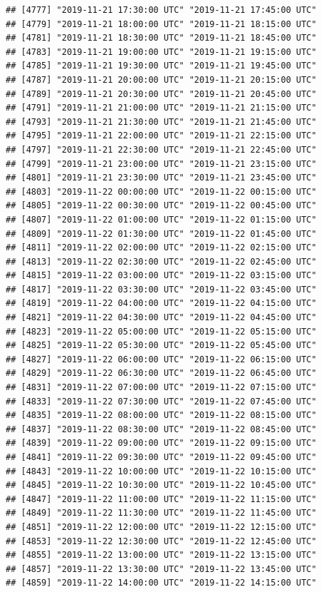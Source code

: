 \documentclass{article}\usepackage[]{graphicx}\usepackage[]{color}
\makeatletter
\newenvironment{kframe}{%
 \def\at@end@of@kframe{}%
 \ifinner\ifhmode%
  \def\at@end@of@kframe{\end{minipage}}%
  \begin{minipage}{\columnwidth}%
 \fi\fi%
 \def\FrameCommand##1{\hskip\@totalleftmargin \hskip-\fboxsep
 \colorbox{shadecolor}{##1}\hskip-\fboxsep
     \hskip-\linewidth \hskip-\@totalleftmargin \hskip\columnwidth}%
 \MakeFramed {\advance\hsize-\width
   \@totalleftmargin\z@ \linewidth\hsize
   \@setminipage}}%
 {\par\unskip\endMakeFramed%
 \at@end@of@kframe}
\newenvironment{knitrout}{}{} %
\makeatother
\begin{document}
\begin{knitrout}
\begin{kframe}
\begin{verbatim}
## [4777] "2019-11-21 17:30:00 UTC" "2019-11-21 17:45:00 UTC"
## [4779] "2019-11-21 18:00:00 UTC" "2019-11-21 18:15:00 UTC"
## [4781] "2019-11-21 18:30:00 UTC" "2019-11-21 18:45:00 UTC"
## [4783] "2019-11-21 19:00:00 UTC" "2019-11-21 19:15:00 UTC"
## [4785] "2019-11-21 19:30:00 UTC" "2019-11-21 19:45:00 UTC"
## [4787] "2019-11-21 20:00:00 UTC" "2019-11-21 20:15:00 UTC"
## [4789] "2019-11-21 20:30:00 UTC" "2019-11-21 20:45:00 UTC"
## [4791] "2019-11-21 21:00:00 UTC" "2019-11-21 21:15:00 UTC"
## [4793] "2019-11-21 21:30:00 UTC" "2019-11-21 21:45:00 UTC"
## [4795] "2019-11-21 22:00:00 UTC" "2019-11-21 22:15:00 UTC"
## [4797] "2019-11-21 22:30:00 UTC" "2019-11-21 22:45:00 UTC"
## [4799] "2019-11-21 23:00:00 UTC" "2019-11-21 23:15:00 UTC"
## [4801] "2019-11-21 23:30:00 UTC" "2019-11-21 23:45:00 UTC"
## [4803] "2019-11-22 00:00:00 UTC" "2019-11-22 00:15:00 UTC"
## [4805] "2019-11-22 00:30:00 UTC" "2019-11-22 00:45:00 UTC"
## [4807] "2019-11-22 01:00:00 UTC" "2019-11-22 01:15:00 UTC"
## [4809] "2019-11-22 01:30:00 UTC" "2019-11-22 01:45:00 UTC"
## [4811] "2019-11-22 02:00:00 UTC" "2019-11-22 02:15:00 UTC"
## [4813] "2019-11-22 02:30:00 UTC" "2019-11-22 02:45:00 UTC"
## [4815] "2019-11-22 03:00:00 UTC" "2019-11-22 03:15:00 UTC"
## [4817] "2019-11-22 03:30:00 UTC" "2019-11-22 03:45:00 UTC"
## [4819] "2019-11-22 04:00:00 UTC" "2019-11-22 04:15:00 UTC"
## [4821] "2019-11-22 04:30:00 UTC" "2019-11-22 04:45:00 UTC"
## [4823] "2019-11-22 05:00:00 UTC" "2019-11-22 05:15:00 UTC"
## [4825] "2019-11-22 05:30:00 UTC" "2019-11-22 05:45:00 UTC"
## [4827] "2019-11-22 06:00:00 UTC" "2019-11-22 06:15:00 UTC"
## [4829] "2019-11-22 06:30:00 UTC" "2019-11-22 06:45:00 UTC"
## [4831] "2019-11-22 07:00:00 UTC" "2019-11-22 07:15:00 UTC"
## [4833] "2019-11-22 07:30:00 UTC" "2019-11-22 07:45:00 UTC"
## [4835] "2019-11-22 08:00:00 UTC" "2019-11-22 08:15:00 UTC"
## [4837] "2019-11-22 08:30:00 UTC" "2019-11-22 08:45:00 UTC"
## [4839] "2019-11-22 09:00:00 UTC" "2019-11-22 09:15:00 UTC"
## [4841] "2019-11-22 09:30:00 UTC" "2019-11-22 09:45:00 UTC"
## [4843] "2019-11-22 10:00:00 UTC" "2019-11-22 10:15:00 UTC"
## [4845] "2019-11-22 10:30:00 UTC" "2019-11-22 10:45:00 UTC"
## [4847] "2019-11-22 11:00:00 UTC" "2019-11-22 11:15:00 UTC"
## [4849] "2019-11-22 11:30:00 UTC" "2019-11-22 11:45:00 UTC"
## [4851] "2019-11-22 12:00:00 UTC" "2019-11-22 12:15:00 UTC"
## [4853] "2019-11-22 12:30:00 UTC" "2019-11-22 12:45:00 UTC"
## [4855] "2019-11-22 13:00:00 UTC" "2019-11-22 13:15:00 UTC"
## [4857] "2019-11-22 13:30:00 UTC" "2019-11-22 13:45:00 UTC"
## [4859] "2019-11-22 14:00:00 UTC" "2019-11-22 14:15:00 UTC"

\end{verbatim}
\end{kframe}
\end{knitrout}
\end{document}
